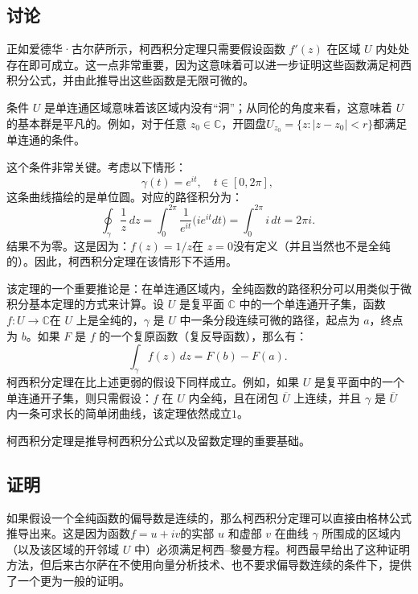 \subsection{讨论}
正如爱德华·古尔萨所示，柯西积分定理只需要假设函数 $f'(z)$ 在区域 $U$ 内处处存在即可成立。这一点非常重要，因为这意味着可以进一步证明这些函数满足柯西积分公式，并由此推导出这些函数是无限可微的。

条件 $U$ 是单连通区域意味着该区域内没有“洞”；从同伦的角度来看，这意味着 $U$ 的基本群是平凡的。例如，对于任意 $z_0 \in \mathbb{C}$，开圆盘$U_{z_0} = \{z : |z - z_0| < r \}$都满足单连通的条件。

这个条件非常关键。考虑以下情形：
$$
\gamma(t) = e^{it}, \quad t \in [0, 2\pi],~
$$
这条曲线描绘的是单位圆。对应的路径积分为：
$$
\oint_{\gamma} \frac{1}{z}\,dz
= \int_0^{2\pi} \frac{1}{e^{it}} \big(i e^{it} dt\big)
= \int_0^{2\pi} i\, dt
= 2\pi i.~
$$
结果不为零。这是因为：$f(z) = 1/z$在 $z = 0$没有定义（并且当然也不是全纯的）。因此，柯西积分定理在该情形下不适用。

该定理的一个重要推论是：在单连通区域内，全纯函数的路径积分可以用类似于微积分基本定理的方式来计算。设 $U$ 是复平面 $\mathbb{C}$ 中的一个单连通开子集，函数$f: U \to \mathbb{C}$在 $U$ 上是全纯的，$\gamma$ 是 $U$ 中一条分段连续可微的路径，起点为 $a$，终点为 $b$。如果 $F$ 是 $f$ 的一个复原函数（复反导函数），那么有：
$$
\int_{\gamma} f(z)\,dz = F(b) - F(a).~
$$
柯西积分定理在比上述更弱的假设下同样成立。例如，如果 $U$ 是复平面中的一个单连通开子集，则只需假设：$f$ 在 $U$ 内全纯，且在闭包 $\overline{U}$ 上连续，并且 $\gamma$ 是 $\overline{U}$ 内一条可求长的简单闭曲线，该定理依然成立$1$。

柯西积分定理是推导柯西积分公式以及留数定理的重要基础。
\subsection{证明}
如果假设一个全纯函数的偏导数是连续的，那么柯西积分定理可以直接由格林公式推导出来。这是因为函数$f = u + iv$的实部 $u$ 和虚部 $v$ 在曲线 $\gamma$ 所围成的区域内（以及该区域的开邻域 $U$ 中）必须满足柯西–黎曼方程。柯西最早给出了这种证明方法，但后来古尔萨在不使用向量分析技术、也不要求偏导数连续的条件下，提供了一个更为一般的证明。

